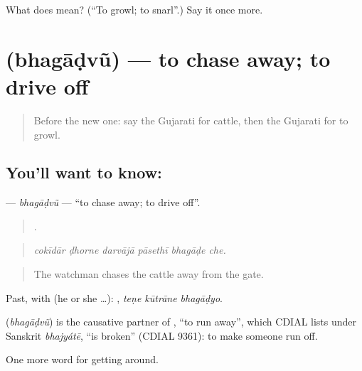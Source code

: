 \begin{tcolorbox}[breakable,colback=teal!4,colframe=teal!35!black,title={Before you move on}]
What does  mean? (\textquotedblleft{}To growl; to snarl\textquotedblright{}.) Say it once more.
\end{tcolorbox}
\section[\texorpdfstring{\gu{ભગાડવું} (bhagāḍvũ)}{ભગાડવું (bhagāḍvũ)}]{ (bhagāḍvũ) — to chase away; to drive off}

\label{lesson:GU-C421-bhagadvu}



\begin{quote}
Before the new one: say the Gujarati for cattle, then the Gujarati for to growl.
\end{quote}

\subsection*{You'll want to know: }
\textbf{} — \emph{bhagāḍvũ} — \textquotedblleft{}to chase away; to drive off\textquotedblright{}.

\begin{quote}
     .
\end{quote}

\begin{quote}
\emph{cokīdār ḍhorne darvājā pāsethī bhagāḍe che.}
\end{quote}

\begin{quote}
The watchman chases the cattle away from the gate.
\end{quote}

Past, with  (he or she …):   , \emph{teṇe kūtrāne bhagāḍyo}.

\begin{cousinweb}
\textbf{} (\emph{bhagāḍvũ}) is the causative partner of , \textquotedblleft{}to run away\textquotedblright{}, which CDIAL lists under Sanskrit \emph{bhajyátē}, \textquotedblleft{}is broken\textquotedblright{} (CDIAL 9361): to make someone run off.
\end{cousinweb}

\begin{grammarlens}[title={What you've built}]
One more word for getting around.
\end{grammarlens}

